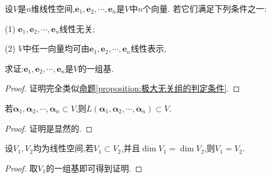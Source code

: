 \documentclass[../../main.tex]{subfiles}%
\begin{document}
\begin{proposition}
设\(V\)是\(n\)维线性空间,\(\boldsymbol{e}_1,\boldsymbol{e}_2,\cdots,\boldsymbol{e}_n\)是\(V\)中\(n\)个向量. 若它们满足下列条件之一:

(1) \(\boldsymbol{e}_1,\boldsymbol{e}_2,\cdots,\boldsymbol{e}_n\)线性无关;

(2) \(V\)中任一向量均可由\(\boldsymbol{e}_1,\boldsymbol{e}_2,\cdots,\boldsymbol{e}_n\)线性表示,

求证:\(\boldsymbol{e}_1,\boldsymbol{e}_2,\cdots,\boldsymbol{e}_n\)是\(V\)的一组基.
\end{proposition}
\begin{proof}

证明完全类似\hyperref[proposition:极大无关组的判定条件]{命题\ref{proposition:极大无关组的判定条件}}.

\end{proof}

\begin{proposition}\label{proposition:包含所有向量的空间也包含这些向量张成的空间}
若$\boldsymbol{\alpha }_1,\boldsymbol{\alpha }_2,\cdots ,\boldsymbol{\alpha }_n\subset V$,则$L\left( \boldsymbol{\alpha }_1,\boldsymbol{\alpha }_2,\cdots ,\boldsymbol{\alpha }_n \right) \subset V$.
\end{proposition}
\begin{proof}

证明是显然的.

\end{proof}

\begin{proposition}\label{proposition:与全空间维数相同的子空间等于全空间}
设\(V_1,V_2\)均为线性空间,若\(V_1\subset V_2\),并且\(\dim V_1 = \dim V_2\),则\(V_1 = V_2\).
\end{proposition}
\begin{proof}

取$V_1$的一组基即可得到证明.

\end{proof}
\end{document}
